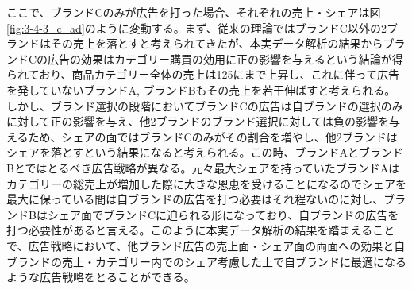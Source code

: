 \documentclass[11pt]{jsarticle}
\begin{document}
ここで、ブランドCのみが広告を打った場合、それぞれの売上・シェアは図\ref{fig:3-4-3_c_ad}のように変動する。まず、従来の理論ではブランドC以外の2ブランドはその売上を落とすと考えられてきたが、本実データ解析の結果からブランドCの広告の効果はカテゴリー購買の効用に正の影響を与えるという結論が得られており、商品カテゴリー全体の売上は125にまで上昇し、これに伴って広告を発していないブランドA, ブランドBもその売上を若干伸ばすと考えられる。しかし、ブランド選択の段階においてブランドCの広告は自ブランドの選択のみに対して正の影響を与え、他2ブランドのブランド選択に対しては負の影響を与えるため、シェアの面ではブランドCのみがその割合を増やし、他2ブランドはシェアを落とすという結果になると考えられる。この時、ブランドAとブランドBとではとるべき広告戦略が異なる。元々最大シェアを持っていたブランドAはカテゴリーの総売上が増加した際に大きな恩恵を受けることになるのでシェアを最大に保っている間は自ブランドの広告を打つ必要はそれ程ないのに対し、ブランドBはシェア面でブランドCに迫られる形になっており、自ブランドの広告を打つ必要性があると言える。このように本実データ解析の結果を踏まえることで、広告戦略において、他ブランド広告の売上面・シェア面の両面への効果と自ブランドの売上・カテゴリー内でのシェア考慮した上で自ブランドに最適になるような広告戦略をとることができる。
\end{document}
